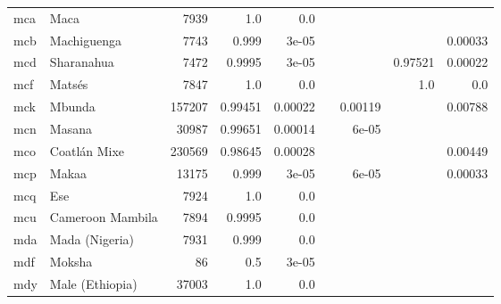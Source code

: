\documentclass[11pt]{article}
\begin{document}
\begin{table*}[h]
{\begin{tabular}{llrrrrrrr}
mca         & Maca         & 7939         & 1.0         & 0.0         &          &          &          &          \\

mcb         & Machiguenga         & 7743         & 0.999         & 3e-05         &          &          &          & 0.00033         \\

mcd         & Sharanahua         & 7472         & 0.9995         & 3e-05         &          &          & 0.97521         & 0.00022         \\

mcf         & Matsés         & 7847         & 1.0         & 0.0         &          &          & 1.0         & 0.0         \\

mck         & Mbunda         & 157207         & 0.99451         & 0.00022         &          & 0.00119         &          & 0.00788         \\

mcn         & Masana         & 30987         & 0.99651         & 0.00014         &          & 6e-05         &          &          \\

mco         & Coatlán Mixe         & 230569         & 0.98645         & 0.00028         &          &          &          & 0.00449         \\

mcp         & Makaa         & 13175         & 0.999         & 3e-05         &          & 6e-05         &          & 0.00033         \\

mcq         & Ese         & 7924         & 1.0         & 0.0         &          &          &          &          \\

mcu         & Cameroon Mambila         & 7894         & 0.9995         & 0.0         &          &          &          &          \\

mda         & Mada (Nigeria)         & 7931         & 0.999         & 0.0         &          &          &          &          \\

mdf         & Moksha         & 86         & 0.5         & 3e-05         &          &          &          &          \\

mdy         & Male (Ethiopia)         & 37003         & 1.0         & 0.0         &          &          &          &          \\


\end{tabular}}
\end{table*}
\end{document}
